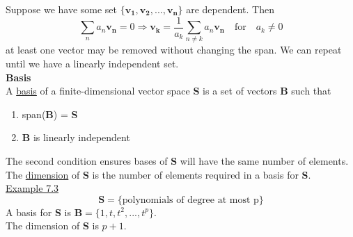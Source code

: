 \documentclass[12pt]{article}
\begin{document}
\newline
Suppose we have some set $ \{\mathbf{v_1},\mathbf{v_2}, ..., \mathbf{v_n}\}$ are dependent. Then
\begin{equation}
    \sum_n a_n \mathbf{v_n} = 0 \Rightarrow \mathbf{v_k} = \frac{1}{a_k} \sum_{n \neq k} a_n \mathbf{v_n} \quad \text{for} \quad  a_k \neq 0
\end{equation}
at least one vector may be removed without changing the span. We can repeat until we have a linearly independent set. \\
\newline
\color{ForestGreen}
\large{\textbf{Basis}}
\color{Black}\\
A \underline{basis} of a finite-dimensional vector space \textbf{S} is a set of vectors \textbf{B} such that
\begin{enumerate}
    \item span(\textbf{B}) = \textbf{S}
    \item \textbf{B} is linearly independent 
\end{enumerate}
The second condition ensures bases of \textbf{S} will have the same number of elements. \\
The \underline{dimension} of \textbf{S} is the number of elements required in a basis for \textbf{S}. \\
\underline{Example 7.3} \\
\begin{equation*}
    \mathbf{S} = \{\text{polynomials of degree at most p}\}
\end{equation*}
A basis for \textbf{S} is $\mathbf{B} = \{1, t, t^2,...,t^p\}$. \\
The dimension of \textbf{S} is $p+1$. \\
\end{document}
